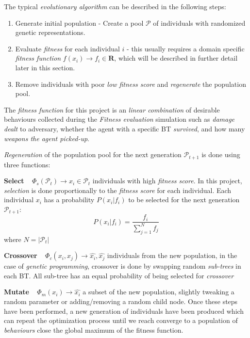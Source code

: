 \documentclass[a4paper, twocolumn]{article}
\begin{document}
	The typical \emph{evolutionary algorithm} can be described in the following steps:
    \begin{enumerate}
        \item Generate initial population - Create a pool \(\mathcal{P}\) of individuals with randomized genetic representations.
        \item Evaluate \emph{fitness} for each individual \(i\) - this usually requires a domain specific \emph{fitness function} \(f(x_i)\rightarrow f_i \in \mathbf{R}\), which will be described in further detail later in this section.
        \item Remove individuals with poor \textit{low fitness score} and \emph{regenerate} the population pool.
    \end{enumerate}

    The \emph{fitness function} for this project is an \emph{linear combination} of desirable behaviours collected during the \emph{Fitness evaluation} simulation such as \emph{damage dealt} to adversary, whether the agent with a specific BT \emph{survived}, and how many \emph{weapons the agent picked-up}. 

	\emph{Regeneration} of the population pool for the next generation \(\mathcal{P}_{t+1}\) is done using three functions:

    \textbf{Select} ~ \(\Phi_s(\mathcal{P}_t) \rightarrow x_i \in \mathcal{P}_t\) individuals with high \emph{fitness score}. In this project, \emph{selection} is done proportionally to the \emph{fitness score} for each individual. Each individual \(x_i\) has a probability \(P(x_i|f_i)\) to be selected for the next generation \(\mathcal{P}_{t+1}\):
    \begin{equation*}
        P(x_i|f_i) = \frac{f_i}{\sum_{j = 1}^{N}f_j}
    \end{equation*}
    where \(N = |\mathcal{P}_t|\)

    \textbf{Crossover} ~ \(\Phi_c(x_i,x_j) \rightarrow \hat{x_i},\hat{x_j}\) individuals from the new population, in the case of \emph{genetic programming}, crossover is done by swapping random \emph{sub-trees} in each BT. All sub-tree has an equal probability of being selected for \emph{crossover}

    \textbf{Mutate} ~ \(\Phi_m(x_i) \rightarrow \hat{x_i}\) a subset of the new population, slightly tweaking a random parameter or adding/removing a random child node. Once these steps have been performed, a new generation of individuals have been produced which can repeat the optimization process until we reach converge to a population of \emph{behaviours} close the global maximum of the fitness function.
\end{document}
